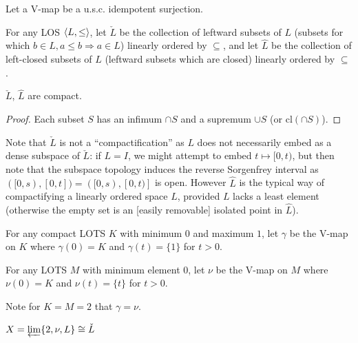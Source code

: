 \documentclass[11pt]{article}
\renewcommand{\cl}{\textrm{cl}}
\begin{document}
  \begin{definition}
    Let a V-map be a u.s.c. idempotent surjection.
  \end{definition}

  \begin{definition}
    For any LOS \(\langle L,\leq\rangle\), let \(\check L\) be the collection of
    leftward subsets of \(L\)
    (subsets for which \(b\in L,a\leq b\Rightarrow a\in L\))
    linearly ordered by \(\subseteq\), and let \(\hat L\) be the collection
    of left-closed subsets of \(L\) (leftward subsets which are closed)
    linearly ordered by \(\subseteq\).
  \end{definition}

  \begin{proposition}
    \(\check L\), \(\hat L\) are compact.
  \end{proposition}

  \begin{proof}
    Each subset \(S\) has an infimum \(\cap S\) and a supremum \(\cup S\)
    (or \(\cl(\cap S)\)).
  \end{proof}

  Note that \(\check L\)
  is not a ``compactification'' as \(L\) does not necessarily
  embed as a dense subspace of \(\check L\): if \(L=I\), we might attempt to embed
  \(t\mapsto [0,t)\), but then note that the subspace topology induces the
  reverse Sorgenfrey interval as \(([0,s),[0,t])=([0,s),[0,t)]\) is open.
  However \(\hat L\) is
  the typical way of compactifying a linearly ordered space \(L\),
  provided \(L\) lacks a least element (otherwise the empty set is an [easily
  removable] isolated point in \(\hat L\)).

  \begin{definition}
    For any compact LOTS \(K\) with minimum \(0\) and maximum \(1\),
    let \(\gamma\) be the V-map on \(K\) where \(\gamma(0)=K\) and \(\gamma(t)=\{1\}\)
    for \(t>0\).
  \end{definition}

  \begin{definition}
    For any LOTS \(M\) with minimum element \(0\),
    let \(\nu\) be the V-map on \(M\) where \(\nu(0)=K\) and \(\nu(t)=\{t\}\)
    for \(t>0\).
  \end{definition}

  Note for \(K=M=2\) that \(\gamma=\nu\).

  \begin{theorem}
    \(X=\varprojlim \{2, \nu, L\}\cong \check L\)
  \end{theorem}
\end{document}
